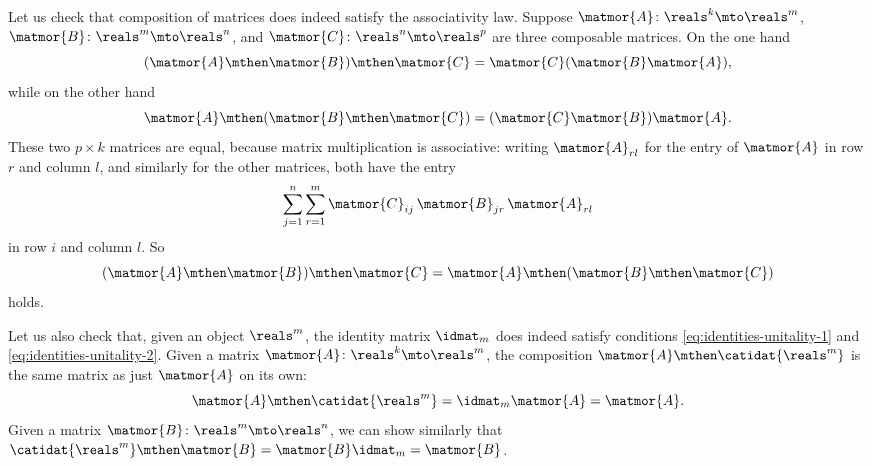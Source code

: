 \begin{example}
    Let us check that composition of matrices does indeed satisfy the associativity law.
    Suppose $\matmor{A} \colon \reals^k \mto \reals^m$, $\matmor{B} \colon \reals^m \mto \reals^n$, and $\matmor{C} \colon \reals^n \mto \reals^p$ are three composable matrices.
    On the one hand
    \begin{equation}
        \label{eq:MatR-associativity-1}
        (\matmor{A} \mthen \matmor{B}) \mthen \matmor{C} = \matmor{C}(\matmor{B}\matmor{A}),
    \end{equation}
    while on the other hand
    \begin{equation}
        \label{eq:MatR-associativity-2}
        \matmor{A} \mthen (\matmor{B} \mthen \matmor{C}) = (\matmor{C}\matmor{B})\matmor{A}.
    \end{equation}
    These two $p \times k$ matrices are equal, because matrix multiplication is associative: writing $\matmor{A}_{rl}$ for the entry of $\matmor{A}$ in row $r$ and column $l$, and similarly for the other matrices, both have the entry
    \begin{equation}
        \sum_{j=1}^{n} \sum_{r=1}^{m} \matmor{C}_{ij} \, \matmor{B}_{jr} \, \matmor{A}_{rl}
    \end{equation}
    in row $i$ and column $l$. So
    \begin{equation}
        \label{eq:MatR-associativity-3}
        (\matmor{A} \mthen \matmor{B}) \mthen \matmor{C} = \matmor{A} \mthen (\matmor{B} \mthen \matmor{C})
    \end{equation}
    holds.

    Let us also check that, given an object $\reals^m$, the identity matrix $\idmat_m$ does indeed satisfy conditions \cref{eq:identities-unitality-1} and \cref{eq:identities-unitality-2}.
    Given a matrix $\matmor{A} \colon \reals^k \mto \reals^m$, the composition $\matmor{A} \mthen \catidat{\reals^m}$ is the same matrix as just $\matmor{A}$ on its own:
    \begin{equation}
        \matmor{A} \mthen \catidat{\reals^m} = \idmat_m \matmor{A} = \matmor{A}.
    \end{equation}
    Given a matrix $\matmor{B} \colon \reals^m \mto \reals^n$, we can show similarly that $\catidat{\reals^m} \mthen \matmor{B} = \matmor{B}\idmat_m = \matmor{B}$.
\end{example}


